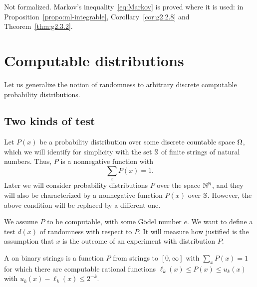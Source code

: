 \begin{formalization}
Not formalized. Markov's inequality~\eqref{eq:Markov} is proved where it is used: in
Proposition~\ref{propo:ml-integrable}, Corollary~\ref{cor:g2.2.8} and
Theorem~\ref{thm:g2.3.2}.
\end{formalization}

\section{Computable distributions}
 \label{sec:discrand}

Let us generalize the notion of randomness to arbitrary discrete computable
probability distributions.

\subsection{Two kinds of test}

Let $P(x)$ be a probability distribution over some discrete countable
space $\Omega$, which we will identify for simplicity with the set $\mathbb{S}$ of
finite strings of natural numbers.
Thus, $P$ is a nonnegative function with
 \[
 \sum_{x} P(x) = 1.
 \]
  Later we will consider probability distributions $P$ over the space
$\mathbb{N}^{\mathbb{N}}$, and they will also be characterized by a nonnegative function
$P(x)$ over $\mathbb{S}$.
However, the above condition will be replaced by a different one.

We assume $P$ to be computable, with some G\"odel number $e$.
We want to define a test $d(x)$ of randomness with respect to $P$.
It will
measure how justified is the assumption that $x$ is the outcome of an
experiment with distribution $P$.

\begin{ourdefinition}
  \label{def:ch2-computable-measure}
  \leanok
A  on binary strings is a function \( P \) from
strings to \( [0,\infty] \) with \( \sum_{x} P(x) = 1 \) for which there are computable
rational functions \( \ell_{k}(x) \le P(x) \le u_{k}(x) \) with
\( u_{k}(x) - \ell_{k}(x) \le 2^{-k} \).
\end{ourdefinition}
\begin{definedinlean}\leanok\end{definedinlean}

